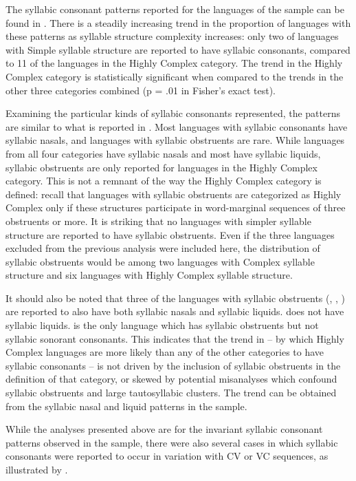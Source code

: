   The syllabic consonant patterns reported for the languages of the sample can be found in . There is a steadily increasing trend in the proportion of languages with these patterns as syllable structure complexity increases: only two of languages with Simple syllable structure are reported to have syllabic consonants, compared to 11 of the languages in the Highly Complex category. The trend in the Highly Complex category is statistically significant when compared to the trends in the other three categories combined (p = .01 in Fisher’s exact test). 
  
  Examining the particular kinds of syllabic consonants represented, the patterns are similar to what is reported in \citet{Bell1978a}. Most languages with syllabic consonants have syllabic nasals, and languages with syllabic obstruents are rare. While languages from all four categories have syllabic nasals and most have syllabic liquids, syllabic obstruents are only reported for languages in the Highly Complex category. This is not a remnant of the way the Highly Complex category is defined: recall that languages with syllabic obstruents are categorized as Highly Complex only if these structures participate in word-marginal sequences of three obstruents or more. It is striking that no languages with simpler syllable structure are reported to have syllabic obstruents. Even if the three languages excluded from the previous analysis were included here, the distribution of syllabic obstruents would be among two languages with Complex syllable structure and six languages with Highly Complex syllable structure. 

  It should also be noted that three of the languages with syllabic obstruents (, , ) are reported to also have both syllabic nasals and syllabic liquids.  does not have syllabic liquids.  is the only language which has syllabic obstruents but not syllabic sonorant consonants. This indicates that the trend in  -- by which Highly Complex languages are more likely than any of the other categories to have syllabic consonants  -- is not driven by the inclusion of syllabic obstruents in the definition of that category, or skewed by potential misanalyses which confound syllabic obstruents and large tautosyllabic clusters. The trend can be obtained from the syllabic nasal and liquid patterns in the sample.

  While the analyses presented above are for the invariant syllabic consonant patterns observed in the sample, there were also several cases in which syllabic consonants were reported to occur in variation with CV or VC sequences, as illustrated by .

